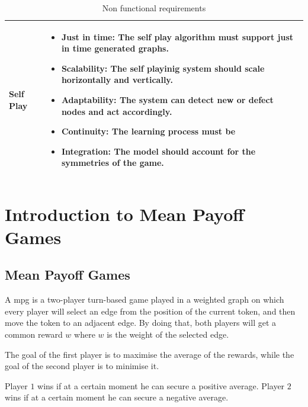 \begin{table}[h]
\begin{tabularx}{\textwidth}{| p{3cm} | X |}
		\hline
		Self Play &\begin{itemize}
			\item \textbf{Just in time}: The self play algorithm must support just in time generated graphs.
			\item \textbf{Scalability}: The self playinig system should scale horizontally and vertically.
			\item \textbf{Adaptability}: The system can detect new or defect nodes and act accordingly.
			\item \textbf{Continuity}: The learning process must be 
			\item \textbf{Integration}: The model should account for the symmetries of the game.
		\end{itemize} \\
		
		\hline
	\end{tabularx}
	\caption{Non functional requirements
		\label{table:NonFunctionalRequirements}}
\end{table}
\section{Introduction to Mean Payoff Games}
\subsection{Mean Payoff Games}
A \acrfull{mpg} is a two-player turn-based game played in a weighted graph on which every player will select an edge from the position of the current token, and then move the token to an adjacent edge.
By doing that, both players will get a common reward $w$ where $w$ is the weight of the selected edge.

The goal of the first player is to maximise the average of the rewards, while the goal of the second player is to minimise it. 

Player $1$ wins if at a certain moment he can secure a positive average. Player $2$ wins if at a certain moment he can secure a negative average.


